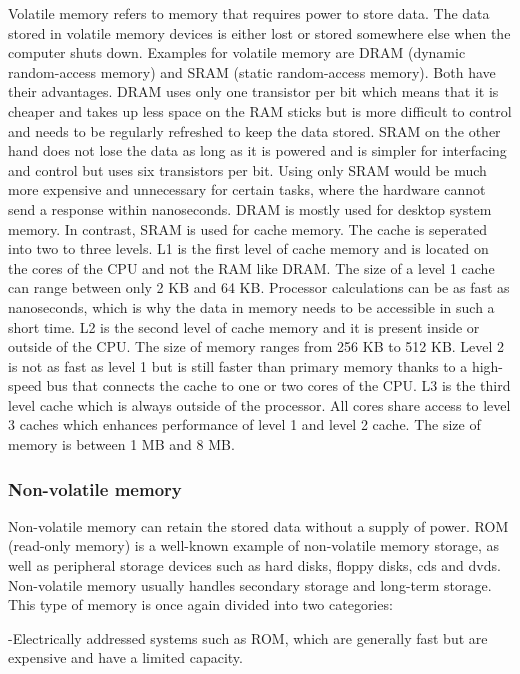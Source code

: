 Volatile memory refers to memory that requires power to store data. The data stored in volatile memory
devices is either lost or stored somewhere else when the computer shuts down. Examples for volatile 
memory are DRAM (dynamic random-access memory) and SRAM (static random-access memory). Both have their
advantages. DRAM uses only one transistor per bit which means that it is cheaper and takes up less 
space on the RAM sticks but is more difficult to control and needs to be regularly refreshed to keep
the data stored. SRAM on the other hand does not lose the data as long as it is powered and is simpler for interfacing
and control but uses six transistors per bit. Using only SRAM would be much more expensive and unnecessary for 
certain tasks, where the hardware cannot send a response within nanoseconds. DRAM is mostly used for desktop system memory. 
In contrast, SRAM is used for cache memory. The cache is seperated into two to three levels. 
L1 is the first level of cache memory and is located on the cores of the CPU and not the RAM like DRAM. The 
size of a level 1 cache can range between only 2 KB and 64 KB. Processor calculations can be as fast as nanoseconds, which
is why the data in memory needs to be accessible in such a short time. L2 is the second level of cache memory
and it is present inside or outside of the CPU. The size of memory ranges from 256 KB to 512 KB.
Level 2 is not as fast as level 1 but is still faster than primary memory thanks to a high-speed bus
that connects the cache to one or two cores of the CPU. L3 is the third level cache which is always outside
of the processor. All cores share access to level 3 caches which enhances performance of level 1 and
level 2 cache. The size of memory is between 1 MB and 8 MB.

\subsubsection{Non-volatile memory}

Non-volatile memory can retain the stored data without a supply of power. ROM (read-only memory) is a well-known
example of non-volatile memory storage, as well as peripheral storage devices such as hard disks, floppy disks, cds and 
dvds. Non-volatile memory usually handles secondary storage and long-term storage. This type of memory is once again
divided into two categories:

-Electrically addressed systems such as ROM, which are generally fast but are expensive and
have a limited capacity. 


